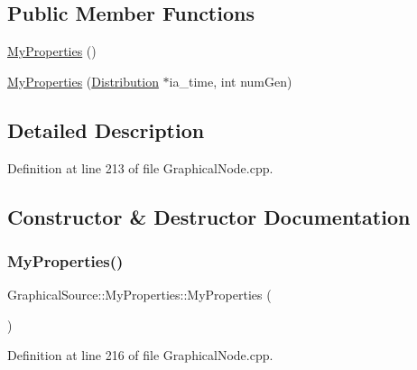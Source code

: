 \subsection*{Public Member Functions}
\begin{DoxyCompactItemize}
\item 
\hyperlink{class_graphical_source_1_1_my_properties_acc58331edfcac5c611f0aa4bcce6b40c}{My\+Properties} ()
\item 
\hyperlink{class_graphical_source_1_1_my_properties_a6be6129d4059d6110306744955e8744a}{My\+Properties} (\hyperlink{class_distribution}{Distribution} $\ast$ia\+\_\+time, int num\+Gen)
\end{DoxyCompactItemize}


\subsection{Detailed Description}


Definition at line 213 of file Graphical\+Node.\+cpp.



\subsection{Constructor \& Destructor Documentation}
\mbox{\label{class_graphical_source_1_1_my_properties_acc58331edfcac5c611f0aa4bcce6b40c}} 
\subsubsection{\texorpdfstring{My\+Properties()}{MyProperties()}\hspace{0.1cm}{\footnotesize\ttfamily [1/2]}}
{\footnotesize\ttfamily Graphical\+Source\+::\+My\+Properties\+::\+My\+Properties (\begin{DoxyParamCaption}{ }\end{DoxyParamCaption})\hspace{0.3cm}{\ttfamily [inline]}}



Definition at line 216 of file Graphical\+Node.\+cpp.

\mbox{\label{class_graphical_source_1_1_my_properties_a6be6129d4059d6110306744955e8744a}} 
